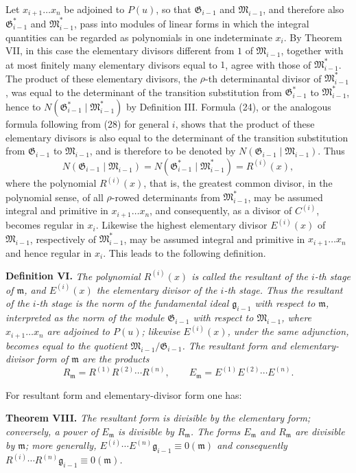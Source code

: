 \documentclass[11pt]{article}
\providecommand{\Gmod}{\mathfrak G}
\providecommand{\mideal}{\mathfrak m}
\providecommand{\gideal}{\mathfrak g}
\providecommand{\Gmod}{\mathfrak G}
\providecommand{\Mmod}{\mathfrak M}
\providecommand{\mideal}{\mathfrak m}
\providecommand{\gideal}{\mathfrak g}
\begin{document}
Let $x_{i+1}\ldots x_n$ be adjoined to $P(u)$, so that $\Gmod_{i-1}$ and $\Mmod_{i-1}$, and therefore also $\Gmod^*_{i-1}$ and $\Mmod^*_{i-1}$, pass into modules of linear forms in which the integral quantities can be regarded as polynomials in one indeterminate $x_i$. By Theorem VII, in this case the elementary divisors different from $1$ of $\Mmod_{i-1}$, together with at most finitely many elementary divisors equal to $1$, agree with those of $\Mmod^*_{i-1}$. The product of these elementary divisors, the $\rho$-th determinantal divisor of $\Mmod^*_{i-1}$, was equal to the determinant of the transition substitution from $\Gmod^*_{i-1}$ to $\Mmod^*_{i-1}$, hence to $N(\Gmod^*_{i-1}\mid\Mmod^*_{i-1})$ by Definition III. Formula (24), or the analogous formula following from (28) for general $i$, shows that the product of these elementary divisors is also equal to the determinant of the transition substitution from $\Gmod_{i-1}$ to $\Mmod_{i-1}$, and is therefore to be denoted by $N(\Gmod_{i-1}\mid\Mmod_{i-1})$. Thus
\[
 N(\Gmod_{i-1}\mid\Mmod_{i-1})=N(\Gmod^*_{i-1}\mid\Mmod^*_{i-1})=R^{(i)}(x),
\]
where the polynomial $R^{(i)}(x)$, that is, the greatest common divisor, in the polynomial sense, of all $\rho$-rowed determinants from $\Mmod^*_{i-1}$, may be assumed integral and primitive in $x_{i+1}\ldots x_n$, and consequently, as a divisor of $C^{(i)}$, becomes regular in $x_i$. Likewise the highest elementary divisor $E^{(i)}(x)$ of $\Mmod_{i-1}$, respectively of $\Mmod^*_{i-1}$, may be assumed integral and primitive in $x_{i+1}\ldots x_n$ and hence regular in $x_i$. This leads to the following definition.

\medskip
\noindent\textbf{Definition VI.} \emph{The polynomial $R^{(i)}(x)$ is called the resultant of the $i$-th stage of $\mideal$, and $E^{(i)}(x)$ the elementary divisor of the $i$-th stage. Thus the resultant of the $i$-th stage is the norm of the fundamental ideal $\gideal_{i-1}$ with respect to $\mideal$, interpreted as the norm of the module $\Gmod_{i-1}$ with respect to $\Mmod_{i-1}$, where $x_{i+1}\ldots x_n$ are adjoined to $P(u)$; likewise $E^{(i)}(x)$, under the same adjunction, becomes equal to the quotient $\Mmod_{i-1}/\Gmod_{i-1}$. The resultant form and elementary-divisor form of $\mideal$ are the products}
\[
 R_\mideal=R^{(1)}R^{(2)}\cdots R^{(n)},\qquad
 E_\mideal=E^{(1)}E^{(2)}\cdots E^{(n)}.
\]

For resultant form and elementary-divisor form one has:

\medskip
\noindent\textbf{Theorem VIII.} \emph{The resultant form is divisible by the elementary form; conversely, a power of $E_\mideal$ is divisible by $R_\mideal$. The forms $E_\mideal$ and $R_\mideal$ are divisible by $\mideal$; more generally, $E^{(i)}\cdots E^{(n)}\gideal_{i-1}\equiv0(\mideal)$ and consequently $R^{(i)}\cdots R^{(n)}\gideal_{i-1}\equiv0(\mideal)$.}
\end{document}
